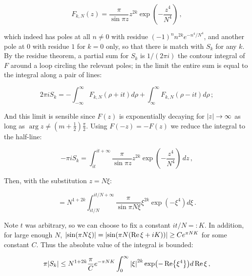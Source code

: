 \documentclass{article}
\begin{document}
\begin{equation}
    F_{k,N}(z) = \frac{\pi}{\sin{\pi z}} z^{2k} \exp(-\frac{z^4}{N^4})\,,
\end{equation}



which indeed has poles at all $n \neq 0$ with residue $(-1)^n n^{2k} e^{-n^4/N^4}$, and another pole at $0$ with residue $1$ for $k=0$ only, so that there is match with $S_k$ for any $k$. By the residue theorem, a partial sum for $S_k$ is $1/(2\pi i)$ the contour integral of $F$ around a loop circling the relevant poles; in the limit the entire sum is equal to the integral along a pair of lines:

\begin{equation}
    2\pi i S_k = -\int_{-\infty}^\infty F_{k,N}(\rho + it) d\rho + \int_\infty^\infty F_{k,N}(\rho-it)d\rho\,;
\end{equation}

And this limit is sensible since $F(z)$ is exponentially decaying for $\abs{z} \rightarrow \infty$ as long as $\arg{z} \neq (m+\frac{1}{2}) \frac{\pi}{2}$. Using $F(-z) = - F(z)$ we reduce the integral to the half-line:

\begin{equation}
    - \pi i S_k = \int_{it}^{it + \infty} \frac{\pi}{\sin{\pi z}} z^{2k} \exp(-\frac{z^4}{N^4})\,dz\,,
\end{equation}

Then, with the substitution $z = N \xi$:

\begin{equation}
    = N^{1+2k} \int_{it/N}^{it/N + \infty} \frac{\pi}{\sin{\pi N \xi}} \xi^{2k} \exp(-\xi^4) d\xi\,.
\end{equation}

Note $t$ was arbitrary, so we can choose to fix a constant $it/N =: K$. In addition, for large enough $N$, $\abs{\sin(\pi N \xi)} = \abs{\sin(\pi N (\Re \xi + iK))} \geq C e^{\pi N K}$ for some constant $C$. Thus the absolute value of the integral is bounded:

\begin{equation}
    \pi \abs{S_k} \leq N^{1+2k} \frac{\pi}{C} e^{-\pi N K} \int_0^{\infty} \abs{\xi}^{2k} \exp(-\Re{\xi^{4}}) d\Re\xi\,,
\end{equation}
\end{document}
